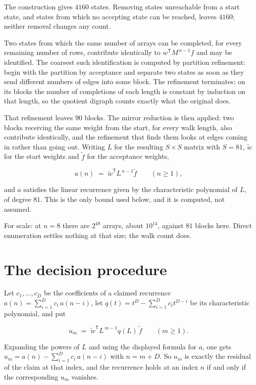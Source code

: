 \documentclass[11pt]{article}
\theoremstyle{definition}
\begin{document}
The construction gives $4160$ states. Removing states unreachable from a start state, and states from which no accepting state can be reached, leaves $4160$; neither removal changes any count.

Two states from which the same number of arrays can be completed, for every remaining number of rows, contribute identically to $w^{\mathsf T}M^{\,n-1}f$ and may be identified. The coarsest such identification is computed by partition refinement: begin with the partition by acceptance and separate two states as soon as they send different numbers of edges into some block. The refinement terminates; on its blocks the number of completions of each length is constant by induction on that length, so the quotient digraph counts exactly what the original does.

That refinement leaves $90$ blocks. The mirror reduction is then applied: two blocks receiving the same weight from the start, for every walk length, also contribute identically, and the refinement that finds them looks at edges coming in rather than going out. Writing $L$ for the resulting $S \times S$ matrix with $S = 81$, $\tilde w$ for the start weights and $\tilde f$ for the acceptance weights,

\[a(n) \;=\; \tilde w^{\mathsf T} L^{\,n-1} \tilde f \qquad (n \ge 1),\]

and $a$ satisfies the linear recurrence given by the characteristic polynomial of $L$, of degree $81$. This is the only bound used below, and it is computed, not assumed.

For scale: at $n = 8$ there are $2^{48}$ arrays, about $10^{14}$, against $81$ blocks here. Direct enumeration settles nothing at that size; the walk count does.

\section{The decision procedure}

Let $c_1,\dots,c_D$ be the coefficients of a claimed recurrence $a(n) = \sum_{i=1}^{D} c_i\,a(n-i)$, let $q(t) = t^{D} - \sum_{i=1}^{D} c_i t^{D-i}$ be its characteristic polynomial, and put

\[u_m \;=\; \tilde w^{\mathsf T} L^{\,m-1} q(L)\,\tilde f \qquad (m \ge 1).\]

Expanding the powers of $L$ and using the displayed formula for $a$, one gets $u_m = a(n) - \sum_{i=1}^{D} c_i\,a(n-i)$ with $n = m + D$. So $u_m$ is exactly the residual of the claim at that index, and the recurrence holds at an index $n$ if and only if the corresponding $u_m$ vanishes.
\end{document}
